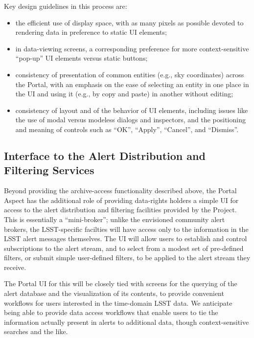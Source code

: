 Key design guidelines in this process are:
\begin{itemize}
\item the efficient use of display space, with as many pixels as possible devoted to rendering data in preference to static UI elements;
\item in data-viewing screens, a corresponding preference for more context-sensitive ``pop-up'' UI elements versus static buttons;
\item consistency of presentation of common entities (e.g., sky coordinates) across the Portal, with an emphasis on the ease of selecting an entity in one place in the UI and using it (e.g., by copy and paste) in another without editing;
\item consistency of layout and of the behavior of UI elements, including issues like the use of modal versus modeless dialogs and inspectors, and the positioning and meaning of controls such as ``OK'', ``Apply'', ``Cancel'', and ``Dismiss''.
\end{itemize}

\subsection{Interface to the Alert Distribution and Filtering Services}

Beyond providing the archive-access functionality described above, the Portal Aspect has the additional role of providing data-rights holders a simple UI for access to the alert distribution and filtering facilities provided by the Project.
This is essentially a ``mini-broker''; unlike the envisioned community alert brokers, the LSST-specific facilties will have access only to the information in the LSST alert messages themselves.
The UI will allow users to establish and control subscriptions to the alert stream, and to select from a modest set of pre-defined filters, or submit simple user-defined filters, to be applied to the alert stream they receive.

The Portal UI for this will be closely tied with screens for the querying of the alert database and the visualization of its contents, to provide convenient workflows for users interested in the time-domain LSST data.
We anticipate being able to provide data access workflows that enable users to tie the information actually present in alerts to additional data, though context-sensitive searches and the like.
